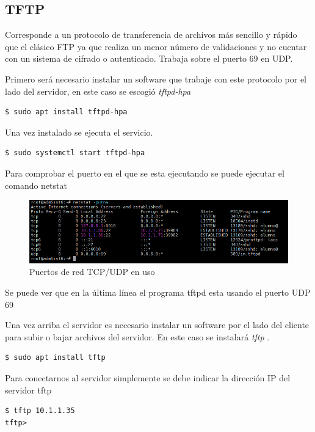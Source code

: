\documentclass[12pt]{article}
\begin{document}
\subsection{TFTP}

Corresponde a un protocolo de transferencia de archivos más sencillo y rápido que el clásico FTP ya que realiza un menor número de validaciones y no cuentar con un sistema de cifrado o autenticado. Trabaja sobre el puerto 69 en UDP.\cite{tftp}

Primero será necesario instalar un software que trabaje con este protocolo por el lado del servidor, en este caso se escogió \emph{tftpd-hpa}

\begin{lstlisting}[frame=single]
$ sudo apt install tftpd-hpa
\end{lstlisting}

Una vez instalado se ejecuta el servicio.
\begin{lstlisting}[frame=single]
$ sudo systemctl start tftpd-hpa
\end{lstlisting}

Para comprobar el puerto en el que se esta ejecutando se puede ejecutar el comando netstat

\begin{figure}[!h]
   \centering
   \includegraphics[scale=.69]{imgs/netstat1.png}
   \caption{Puertos de red TCP/UDP en uso}
   \label{fig7}
\end{figure}
Se puede ver que en la última línea el programa tftpd esta usando el puerto UDP 69

Una vez arriba el servidor es necesario instalar un software por el lado del cliente para subir o bajar archivos del servidor. En este caso se instalará  \emph{tftp} .

\begin{lstlisting}[frame=single]
$ sudo apt install tftp
\end{lstlisting}

Para conectarnos al servidor simplemente se debe indicar la dirección IP del servidor tftp
\begin{lstlisting}[frame=single]
$ tftp 10.1.1.35
tftp>
\end{lstlisting}
\end{document}
